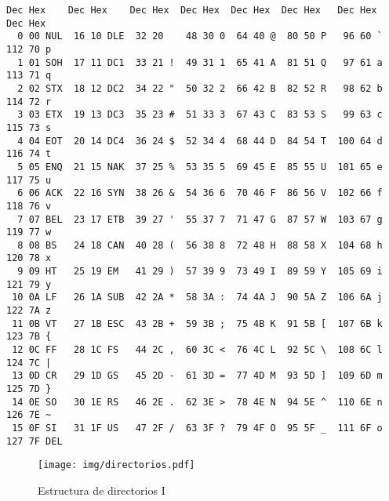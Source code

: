 \documentclass[12pt]{article}
\begin{document}
\begin{verbatim}
Dec Hex    Dec Hex    Dec Hex  Dec Hex  Dec Hex  Dec Hex   Dec Hex   Dec Hex
  0 00 NUL  16 10 DLE  32 20    48 30 0  64 40 @  80 50 P   96 60 `  112 70 p
  1 01 SOH  17 11 DC1  33 21 !  49 31 1  65 41 A  81 51 Q   97 61 a  113 71 q
  2 02 STX  18 12 DC2  34 22 "  50 32 2  66 42 B  82 52 R   98 62 b  114 72 r
  3 03 ETX  19 13 DC3  35 23 #  51 33 3  67 43 C  83 53 S   99 63 c  115 73 s
  4 04 EOT  20 14 DC4  36 24 $  52 34 4  68 44 D  84 54 T  100 64 d  116 74 t
  5 05 ENQ  21 15 NAK  37 25 %  53 35 5  69 45 E  85 55 U  101 65 e  117 75 u
  6 06 ACK  22 16 SYN  38 26 &  54 36 6  70 46 F  86 56 V  102 66 f  118 76 v
  7 07 BEL  23 17 ETB  39 27 '  55 37 7  71 47 G  87 57 W  103 67 g  119 77 w
  8 08 BS   24 18 CAN  40 28 (  56 38 8  72 48 H  88 58 X  104 68 h  120 78 x
  9 09 HT   25 19 EM   41 29 )  57 39 9  73 49 I  89 59 Y  105 69 i  121 79 y
 10 0A LF   26 1A SUB  42 2A *  58 3A :  74 4A J  90 5A Z  106 6A j  122 7A z
 11 0B VT   27 1B ESC  43 2B +  59 3B ;  75 4B K  91 5B [  107 6B k  123 7B {
 12 0C FF   28 1C FS   44 2C ,  60 3C <  76 4C L  92 5C \  108 6C l  124 7C |
 13 0D CR   29 1D GS   45 2D -  61 3D =  77 4D M  93 5D ]  109 6D m  125 7D }
 14 0E SO   30 1E RS   46 2E .  62 3E >  78 4E N  94 5E ^  110 6E n  126 7E ~
 15 0F SI   31 1F US   47 2F /  63 3F ?  79 4F O  95 5F _  111 6F o  127 7F DEL
\end{verbatim}

\begin{figure}

    \centering

    \texttt{[image: img/directorios.pdf]}

    \caption{Estructura de directorios I}

    \label{directorios}

\end{figure}
\end{document}
